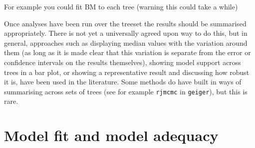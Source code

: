 \documentclass[]{article}
\newenvironment{Shaded}{\begin{snugshade}}{\end{snugshade}}
\newcommand{\KeywordTok}[1]{\textcolor[rgb]{0.13,0.29,0.53}{\textbf{#1}}}
\newcommand{\DataTypeTok}[1]{\textcolor[rgb]{0.13,0.29,0.53}{#1}}
\newcommand{\DecValTok}[1]{\textcolor[rgb]{0.00,0.00,0.81}{#1}}
\newcommand{\StringTok}[1]{\textcolor[rgb]{0.31,0.60,0.02}{#1}}
\newcommand{\CommentTok}[1]{\textcolor[rgb]{0.56,0.35,0.01}{\textit{#1}}}
\newcommand{\ControlFlowTok}[1]{\textcolor[rgb]{0.13,0.29,0.53}{\textbf{#1}}}
\newcommand{\OperatorTok}[1]{\textcolor[rgb]{0.81,0.36,0.00}{\textbf{#1}}}
\newcommand{\NormalTok}[1]{#1}
\begin{document}
For example you could fit BM to each tree (warning this could take a
while)

\begin{Shaded}
\end{Shaded}

Once analyses have been run over the treeset the results should be
summarised appropriately. There is not yet a universally agreed upon way
to do this, but in general, approaches such as displaying median values
with the variation around them (as long as it is made clear that this
variation is separate from the error or confidence intervals on the
results themselves), showing model support across trees in a bar plot,
or showing a representative result and discussing how robust it is, have
been used in the literature. Some methods do have built in ways of
summarising across sets of trees (see for example \texttt{rjmcmc} in
\texttt{geiger}), but this is rare.

\section{Model fit and model
adequacy}\label{model-fit-and-model-adequacy}
\end{document}
